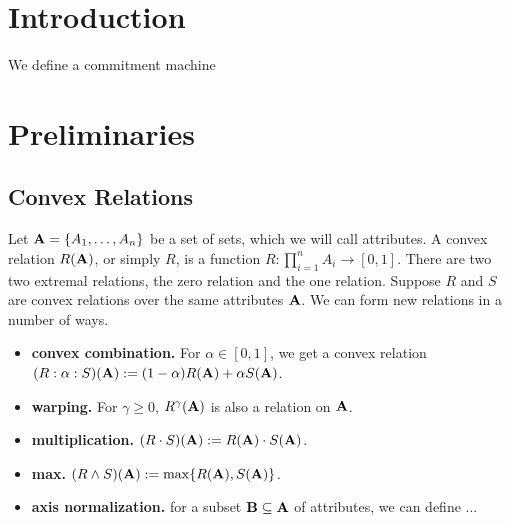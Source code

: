 \documentclass{article}
\newcommand\R{\mathcal R}
\begin{document}
\section{Introduction}

We define a commitment machine

\section{Preliminaries}

\subsection*{Convex Relations}
Let $\mathbf{A} = \{ A_1, \ldots, A_n \}$ be a set of sets, which we will call attributes.
A convex relation $R(\mathbf{A})$, or simply $R$,  is a function
    $R : \prod_{i=1}^n A_i \to [0,1]$.
There are two two extremal relations, the zero relation and the one relation.
Suppose $R$ and $S$ are convex relations over the same attributes $\mathbf{A}$. We can form new relations in a number of ways.
\begin{itemize}
    \item \textbf{convex combination.} For $\alpha \in [0,1]$, we get a convex relation $(R : \alpha : S)(\mathbf{A}) := (1-\alpha) R(\mathbf{A}) + \alpha S(\mathbf{A})$.
    \item \textbf{warping.} For $\gamma \ge 0$,  $R^\gamma(\mathbf{A})$ is also a relation on $\mathbf{A}$.
    \item \textbf{multiplication.} $(R \cdot S)(\mathbf{A}) := R(\mathbf{A}) \cdot S(\mathbf{A})$.
    \item \textbf{max.} $(R \land S)(\mathbf{A}) := \max \{ R(\mathbf{A}),  S(\mathbf{A}) \}$.
    \item \textbf{axis normalization.} for a subset $\mathbf{B} \subseteq \mathbf{A}$ of attributes, we can define ...
    
    \TODO
    
\end{itemize}
\end{document}
